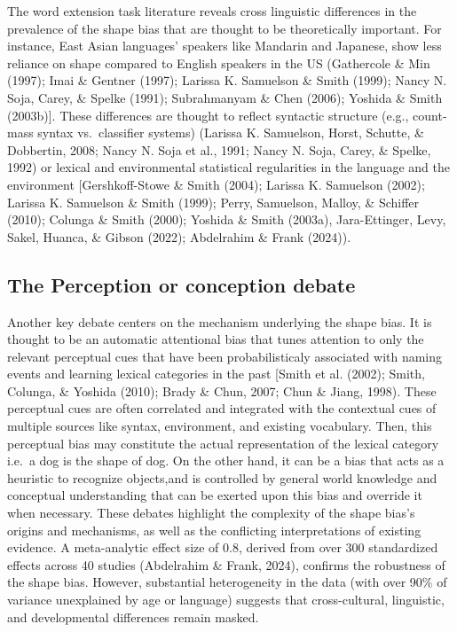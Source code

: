 \documentclass[10pt, letterpaper]{article}
\begin{document}
The word extension task literature reveals cross linguistic differences
in the prevalence of the shape bias that are thought to be theoretically
important. For instance, East Asian languages' speakers like Mandarin
and Japanese, show less reliance on shape compared to English speakers
in the US (Gathercole \& Min (1997); Imai \& Gentner (1997); Larissa K.
Samuelson \& Smith (1999); Nancy N. Soja, Carey, \& Spelke (1991);
Subrahmanyam \& Chen (2006); Yoshida \& Smith (2003b){]}. These
differences are thought to reflect syntactic structure (e.g., count-mass
syntax vs.~classifier systems) (Larissa K. Samuelson, Horst, Schutte, \&
Dobbertin, 2008; Nancy N. Soja et al., 1991; Nancy N. Soja, Carey, \&
Spelke, 1992) or lexical and environmental statistical regularities in
the language and the environment {[}Gershkoff-Stowe \& Smith (2004);
Larissa K. Samuelson (2002); Larissa K. Samuelson \& Smith (1999);
Perry, Samuelson, Malloy, \& Schiffer (2010); Colunga \& Smith (2000);
Yoshida \& Smith (2003a), Jara-Ettinger, Levy, Sakel, Huanca, \& Gibson
(2022); Abdelrahim \& Frank (2024)).

\hypertarget{the-perception-or-conception-debate}{%
\subsection{The Perception or conception
debate}\label{the-perception-or-conception-debate}}

Another key debate centers on the mechanism underlying the shape bias.
It is thought to be an automatic attentional bias that tunes attention
to only the relevant perceptual cues that have been probabilisticaly
associated with naming events and learning lexical categories in the
past {[}Smith et al. (2002); Smith, Colunga, \& Yoshida (2010); Brady \&
Chun, 2007; Chun \& Jiang, 1998). These perceptual cues are often
correlated and integrated with the contextual cues of multiple sources
like syntax, environment, and existing vocabulary. Then, this perceptual
bias may constitute the actual representation of the lexical category
i.e.~a dog is the shape of dog. On the other hand, it can be a bias that
acts as a heuristic to recognize objects,and is controlled by general
world knowledge and conceptual understanding that can be exerted upon
this bias and override it when necessary. These debates highlight the
complexity of the shape bias's origins and mechanisms, as well as the
conflicting interpretations of existing evidence. A meta-analytic effect
size of 0.8, derived from over 300 standardized effects across 40
studies (Abdelrahim \& Frank, 2024), confirms the robustness of the
shape bias. However, substantial heterogeneity in the data (with over
90\% of variance unexplained by age or language) suggests that
cross-cultural, linguistic, and developmental differences remain masked.
\end{document}

